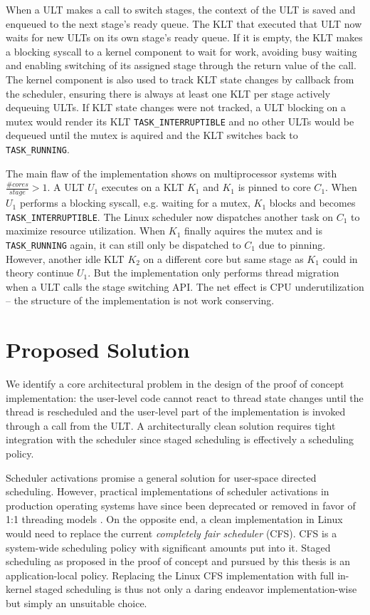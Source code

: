 \documentclass{article}
\begin{document}
When a ULT makes a call to switch stages, the context of the ULT is saved and enqueued to the next stage's ready queue.
The KLT that executed that ULT now waits for new ULTs on its own stage's ready queue.
If it is empty, the KLT makes a blocking syscall to a kernel component to wait for work, avoiding busy waiting
and enabling switching of its assigned stage through the return value of the call.
The kernel component is also used to track KLT state changes by callback from the scheduler, ensuring there is always at
least one KLT per stage actively dequeuing ULTs.
If KLT state changes were not tracked, a ULT blocking on a mutex would render its KLT
\texttt{TASK\_INTERRUPTIBLE} and no other ULTs would be dequeued until the mutex is aquired and the KLT switches back to
\texttt{TASK\_RUNNING}.

The main flaw of the implementation shows on multiprocessor systems with $\frac{\#cores}{stage} > 1$.
A ULT $U_1$ executes on a KLT $K_1$ and $K_1$ is pinned to core $C_1$.
When $U_1$ performs a blocking syscall, e.g. waiting for a mutex, $K_1$ blocks and becomes \texttt{TASK\_INTERRUPTIBLE}.
The Linux scheduler now dispatches another task on $C_1$ to maximize resource utilization.
When $K_1$ finally aquires the mutex and is \texttt{TASK\_RUNNING} again, it can still only be dispatched to $C_1$ due to
pinning.
However, another idle KLT $K_2$ on a different core but same stage as $K_1$ could in theory continue $U_1$.
But the implementation only performs thread migration when a ULT calls the stage switching API.
The net effect is CPU underutilization -- the structure of the implementation is not work conserving.

\section{Proposed Solution}\label{propsolution}

We identify a core architectural problem in the design of the proof of concept implementation:
the user-level code cannot react to thread state changes until the thread is rescheduled and the user-level part of the
implementation is invoked through a call from the ULT. A architecturally clean solution requires tight integration with
the scheduler since staged scheduling is effectively a scheduling policy.

Scheduler activations promise \cite{schedulerActivations} a general solution for user-space directed scheduling.
However, practical implementations of scheduler activations in production operating systems have since been
deprecated or removed in favor of 1:1 threading models \cite{schedulerActivationsNetBSD}.
On the opposite end, a clean implementation in Linux would need to replace the current \emph{completely fair scheduler} (CFS).
CFS is a system-wide scheduling policy with significant amounts put into it.
Staged scheduling as proposed in the proof of concept and pursued by this thesis is an application-local policy.
Replacing the Linux CFS implementation with full in-kernel staged scheduling is thus not only a daring
endeavor implementation-wise but simply an unsuitable choice.
\end{document}
